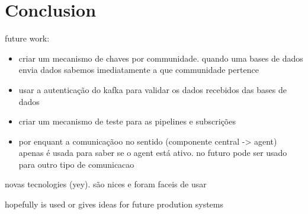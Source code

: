\chapter{Conclusion}
\label{chapter:conclusion}

future work:
\begin{itemize}
    \item criar um mecanismo de chaves por communidade. quando uma bases de dados envia dados sabemos imediatamente a que communidade pertence
    \item usar a autenticação do kafka para validar os dados recebidos das bases de dados
    \item criar um mecanismo de teste para as pipelines e subscrições
    \item por enquant a comunicaçãoo no sentido (componente central -> agent) apenas é usada para saber se o agent está ativo. no futuro pode ser usado para outro tipo de comunicacao
\end{itemize}

novas tecnologies (yey). são nices e foram faceis de usar

hopefully is used or gives ideas for future prodution systems
